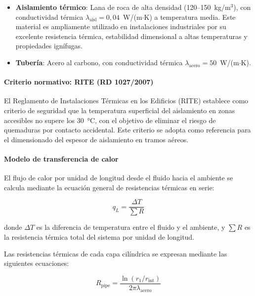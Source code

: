 \begin{itemize}[noitemsep]
	\item \textbf{Aislamiento térmico}: Lana de roca de alta densidad (120--150~kg/m$^3$), con conductividad térmica $\lambda_{\text{aisl}} = 0{,}04$~W/(m$\cdot$K) a temperatura media. Este material es ampliamente utilizado en instalaciones industriales por su excelente resistencia térmica, estabilidad dimensional a altas temperaturas y propiedades ignífugas.
	\item \textbf{Tubería}: Acero al carbono, con conductividad térmica $\lambda_{\text{acero}} = 50$~W/(m$\cdot$K).
\end{itemize}

\paragraph{Criterio normativo: RITE (RD 1027/2007)}
\label{par:criterio_rite}

El Reglamento de Instalaciones Térmicas en los Edificios (RITE) establece como criterio de seguridad que la temperatura superficial del aislamiento en zonas accesibles no supere los 30~°C, con el objetivo de eliminar el riesgo de quemaduras por contacto accidental. Este criterio se adopta como referencia para el dimensionado del espesor de aislamiento en tramos aéreos.

\paragraph{Modelo de transferencia de calor}
\label{par:modelo_transferencia}

El flujo de calor por unidad de longitud desde el fluido hacia el ambiente se calcula mediante la ecuación general de resistencias térmicas en serie:

\begin{equation}
	q_L = \frac{\Delta T}{\sum R}
	\label{eq:perdida_lineal_aisl}
\end{equation}

\noindent donde $\Delta T$ es la diferencia de temperatura entre el fluido y el ambiente, y $\sum R$ es la resistencia térmica total del sistema por unidad de longitud.

Las resistencias térmicas de cada capa cilíndrica se expresan mediante las siguientes ecuaciones:

\begin{equation}
	R_{\text{pipe}} = \frac{\ln(r_1 / r_{\text{int}})}{2\pi \lambda_{\text{acero}}}
	\label{eq:resist_tuberia}
\end{equation}

